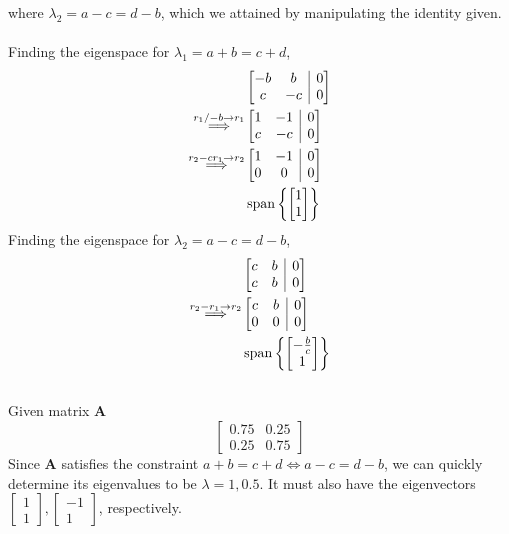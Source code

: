 \documentclass[]{article}
\numberwithin{equation}{section}
\newcommand{\Span}[1]{\operatorname{span}\left\lbrace{#1}\right\rbrace}
\begin{document}
where \(\lambda_2 = a - c = d - b\), which we attained by manipulating the identity given. \\
\\
Finding the eigenspace for \(\lambda_1 = a + b = c + d\), 
\begin{align}
	&\left[\begin{array}{@{}cc|c@{}}
	-b & b & 0 \\
	c & -c & 0
	\end{array}\right] \\
	\overset{r_1/-b \to r_1}{\Longrightarrow} &\left[\begin{array}{@{}cc|c@{}}
	1 & -1 & 0 \\
	c & -c & 0
	\end{array}\right] \\
	\overset{r_2 - c r_1 \to r_2}{\Longrightarrow} &\left[\begin{array}{@{}cc|c@{}}
	1 & -1 & 0 \\
	0 & 0 & 0
	\end{array}\right] \\
	&\Span{\begin{bmatrix}
		1 \\
		1
		\end{bmatrix}}
\end{align}
Finding the eigenspace for \(\lambda_2 = a - c = d - b\), 
\begin{align}
	&\left[\begin{array}{@{}cc|c@{}}
	c & b & 0 \\
	c & b & 0
	\end{array}\right] \\
	\overset{r_2 - r_1 \to r_2}{\Longrightarrow} &\left[\begin{array}{@{}cc|c@{}}
	c & b & 0 \\
	0 & 0 & 0
	\end{array}\right] \\
	&\Span{\begin{bmatrix}
		-\frac{b}{c} \\
		1
		\end{bmatrix}}
\end{align}

\subsection{}

Given matrix \(\mathbf{A}\)
\begin{equation}
	\begin{bmatrix}
	0.75 & 0.25 \\
	0.25 & 0.75
	\end{bmatrix}
\end{equation}
Since \(\mathbf{A}\) satisfies the constraint \(a + b = c + d \Leftrightarrow a - c = d - b\), we can quickly determine its eigenvalues to be \(\lambda = 1, 0.5\). 
It must also have the eigenvectors \(\begin{bmatrix}
1 \\
1
\end{bmatrix},\begin{bmatrix}
-1 \\
1
\end{bmatrix}\), respectively. 
\end{document}
